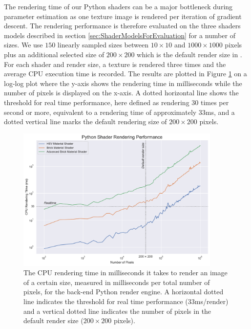The rendering time of our Python shaders can be a major bottleneck during parameter estimation as one texture image is rendered per iteration of gradient descent. The rendering performance is therefore evaluated on the three shaders models described in section \ref{sec:ShaderModelsForEvaluation} for a number of sizes. We use $150$ linearly sampled sizes between $10\times10$ and $1000\times1000$ pixels plus an additional selected size of $200\times200$ which is the default render size in \dipter{}. For each shader and render size, a texture is rendered three times and the average CPU execution time is recorded. The results are plotted in Figure \ref{fig:PythonRenderingPerformance} on a log-log plot where the y-axis shows the rendering time in milliseconds while the number of pixels is displayed on the x-axis. A dotted horizontal line shows the threshold for real time performance, here defined as rendering 30 times per second or more, equivalent to a rendering time of approximately 33ms, and a dotted vertical line marks the default rendering size of $200\times 200$ pixels.

\begin{figure}[h]
    \centering
    \includegraphics[width=0.9\textwidth]{img/evaluation/PythonRenderingPerformance.pdf}
    \caption{The CPU rendering time in milliseconds it takes to render an image of a certain size, measured in milliseconds per total number of pixels, for the back-end Python render engine. A horizontal dotted line indicates the threshold for real time performance ($33$ms/render) and a vertical dotted line indicates the number of pixels in the default render size ($200\times 200$ pixels).}
    \label{fig:PythonRenderingPerformance}
\end{figure}

